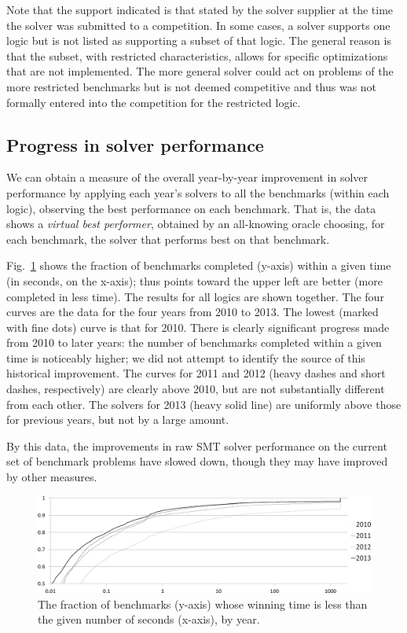 \documentclass[smallcondensed]{svjour3}
\begin{document}
Note that the support indicated is that stated by the solver supplier at the time the solver was submitted to a competition. 
In some cases, a solver supports one logic but is not listed as supporting a subset of that logic. The general reason is that the subset, with restricted characteristics, allows for specific optimizations that are not implemented. The more general solver could act on problems of the
more restricted benchmarks but is not deemed competitive and thus was not formally entered into the competition for the restricted logic.


\subsection{Progress in solver performance}
\label{Progress}

We can obtain a measure of the overall year-by-year improvement in solver performance by applying each year's solvers to all the benchmarks (within each logic), observing the best performance on each benchmark. That is, the data shows a {\em virtual best performer}, obtained by an all-knowing oracle choosing, for each benchmark, the solver that performs best on that benchmark.

Fig.~\ref{Fig:CumulativeTimes} shows the fraction of benchmarks completed (y-axis) within a given time (in seconds, on the x-axis); thus points toward the upper left are better (more completed in less time). The results for all logics are shown together. 
The four curves are the data for the four years from 2010 to 2013. The lowest (marked with fine dots) curve is that for 2010. 
There is clearly significant progress made from 2010 to later years: the number of benchmarks completed within a given time is noticeably higher; we did not attempt to identify the source of this historical improvement. The curves for 2011 and 2012 (heavy dashes and short dashes, respectively) are clearly above 2010, but are not substantially different from each other. The solvers for 2013 (heavy solid line) are uniformly above those for previous years, but not by a large amount.  

By this data, the improvements in raw SMT solver performance on the current set of benchmark problems have slowed down, though they may have improved by other measures.

\begin{figure}
\centering
\includegraphics[width=.95\textwidth]{CumulativeTimes}
\caption{The fraction of benchmarks (y-axis) whose winning time is less than the given number of seconds (x-axis), by year.}
\label{Fig:CumulativeTimes}
\end{figure}
\end{document}
